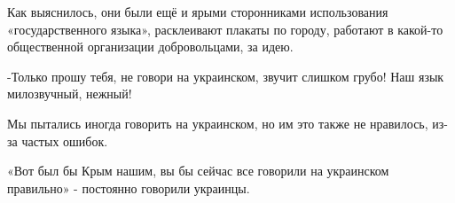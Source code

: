 Как выяснилось, они были ещё и ярыми сторонниками использования
«государственного языка», расклеивают плакаты по городу, работают в какой-то
общественной организации добровольцами, за идею.

-Только прошу тебя, не говори на украинском, звучит слишком грубо! Наш язык
милозвучный, нежный!

Мы пытались иногда говорить на украинском, но им это также не нравилось, из-за
частых ошибок.

«Вот был бы Крым нашим, вы бы сейчас все говорили на украинском правильно» -
постоянно говорили украинцы.

